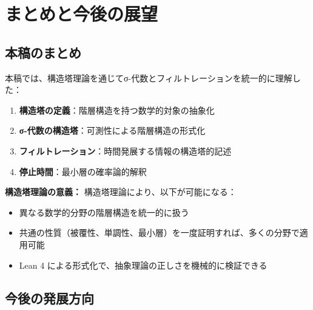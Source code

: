 \documentclass[a4paper,12pt]{ltjsarticle}
\theoremstyle{definition}
\begin{document}
\section{まとめと今後の展望}

\subsection{本稿のまとめ}

本稿では、構造塔理論を通じてσ-代数とフィルトレーションを統一的に理解した：

\begin{enumerate}
  \item \textbf{構造塔の定義}：階層構造を持つ数学的対象の抽象化
  \item \textbf{σ-代数の構造塔}：可測性による階層構造の形式化
  \item \textbf{フィルトレーション}：時間発展する情報の構造塔的記述
  \item \textbf{停止時間}：最小層の確率論的解釈
\end{enumerate}

\begin{keypoint}
\textbf{構造塔理論の意義：}
構造塔理論により、以下が可能になる：
\begin{itemize}
  \item 異なる数学的分野の階層構造を統一的に扱う
  \item 共通の性質（被覆性、単調性、最小層）を一度証明すれば、多くの分野で適用可能
  \item Lean 4 による形式化で、抽象理論の正しさを機械的に検証できる
\end{itemize}
\end{keypoint}

\subsection{今後の発展方向}
\end{document}
